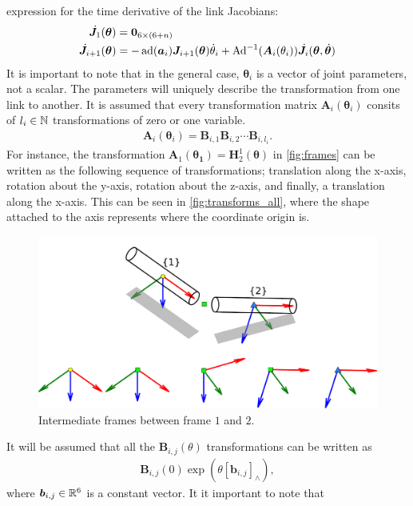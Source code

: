 expression for the time derivative of the link Jacobians:
\begin{align}
    \dot{\bm{J}}_1(\bm{\theta}) &= \bm{0}_{6\times(6+n)} \\
    \dot{\bm{J}}_{i+1}(\bm{\theta}) &= -\operatorname{ad}(\bm{a}_i)\bm{J}_{i+1}(\bm{\theta})\dot{\theta}_i +
        \operatorname{Ad}^{-1}(\bm{A}_i(\theta_i))\dot{\bm{J}}_i(\bm{\theta},\dot{\bm{\theta}})
\end{align}
It is important to note that in the general case, $\bm{\theta}_i$ is a vector of
joint parameters, not a scalar. The parameters will uniquely describe the transformation from one link
to another. It is assumed that every transformation matrix $\bm{A}_i(\bm{\theta}_i)$ consits of $l_i \in \mathbb{N}$ transformations
of zero or one variable.
\begin{align}
    \bm{A}_i(\bm{\theta}_i) = \bm{B}_{i,1} \bm{B}_{i,2} \cdots \bm{B}_{i,l_i}.
\end{align}
For instance, the transformation $\bm{A}_1(\bm{\bm{\theta}_1}) = \bm{H}_2^1(\bm{\theta})$
in \autoref{fig:frames} can be written as the following sequence of transformations;
translation along the x-axis, rotation about the y-axis, rotation about the z-axis, and finally,
a translation along the x-axis. This can be seen in \autoref{fig:transforms_all}, where the shape
attached to the axis represents where the coordinate origin is.
\begin{figure}[h!]
    \centering
    \includegraphics[width=\textwidth]{assets/transforms_all.pdf}
    \caption{Intermediate frames between frame $1$ and $2$.}
    \label{fig:transforms_all}
\end{figure}
It will be assumed that all the $\bm{B}_{i,j}(\theta)$ transformations can be written as
\begin{align}
    \bm{B}_{i,j}(0)\exp\left(\theta[\bm{b}_{i,j}]_{\wedge}\right),
\end{align}
where $\bm{b}_{i,j} \in \mathbb{R}^6$ is a constant vector. It it important to note that
